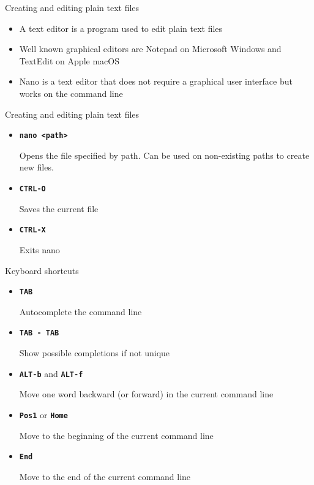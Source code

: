 \documentclass[aspectratio=1610]{beamer}
\newcommand\curtitle{}
\newcommand\command[1]{\alert{\textbf{\texttt{#1}}}}
\begin{document}
\renewcommand\curtitle{Creating and editing plain text files}

\begin{frame}[c]{\curtitle}
    \begin{itemize}[<+->]
        \setlength\itemsep{1em}
        \item A \alert{text editor} is a program used to edit plain text files
        \item Well known graphical editors are \alert{Notepad} on Microsoft Windows and
            \alert{TextEdit} on Apple macOS
        \item \alert{Nano} is a text editor that does not require a graphical user interface but
            works on the command line
    \end{itemize}
\end{frame}


\begin{frame}[c]{\curtitle}
    \begin{itemize}[<+->]
        \setlength\itemsep{1em}
    \item \command{nano <path>}

        Opens the file specified by path. Can be used on non-existing paths to create
        new files.
    \item \command{CTRL-O}

        Saves the current file
    \item \command{CTRL-X}

        Exits nano
\end{itemize}
\end{frame}


\renewcommand\curtitle{Keyboard shortcuts}

\begin{frame}[c]{\curtitle}
    \begin{itemize}
        \item \command{TAB}

            Autocomplete the command line
        \item \command{TAB - TAB}

            Show possible completions if not unique
        \item \command{ALT-b} and \command{ALT-f}

            Move one word backward (or forward) in the current command line
        \item \command{Pos1} or \command{Home}

            Move to the beginning of the current command line
        \item \command{End}

            Move to the end of the current command line
    \end{itemize}
\end{frame}
\end{document}
